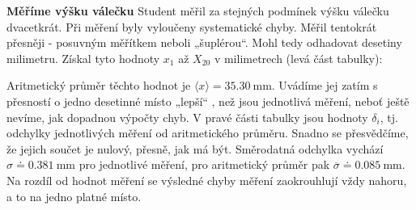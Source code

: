 \begin{mdframed}[style=mdexam]
  \begin{example}\label{mai:exam077}
    \textbf{Měříme výšku válečku}\newline
    Student měřil za stejných podmínek výšku válečku dvacetkrát. Při měření byly vyloučeny
    systematické chyby. Měřil tentokrát přesněji - posuvným měřítkem neboli „šuplérou“. Mohl tedy
    odhadovat desetiny milimetru. Získal tyto hodnoty \(x_1\) až \(X_{20}\) v milimetrech (levá část
    tabulky):
    
    {\centering
    \par}
    \vspace{\baselineskip}
    Aritmetický průměr těchto hodnot je \(\langle x\rangle = \SI{35.30}{\mm}\). Uvádíme jej zatím s
    přesností o jedno desetinné místo „lepší“ , než jsou jednotlivá měření, neboť ještě nevíme, jak
    dopadnou výpočty chyb. V pravé části tabulky jsou hodnoty \(\delta_i\), tj. odchylky
    jednotlivých měření od aritmetického průměru. Snadno se přesvědčíme, že jejich součet je nulový,
    přesně, jak má být. Směrodatná odchylka vychází \(\sigma \doteq \SI{0.381}{\mm}\) pro jednotlivé
    měření, pro aritmetický průměr pak \(\overline{\sigma} \doteq \SI{0.085}{\mm}\). Na rozdíl od
    hodnot měření se výsledné chyby měření zaokrouhlují vždy nahoru, a to na jedno platné místo.

\end{example}
\end{mdframed}
